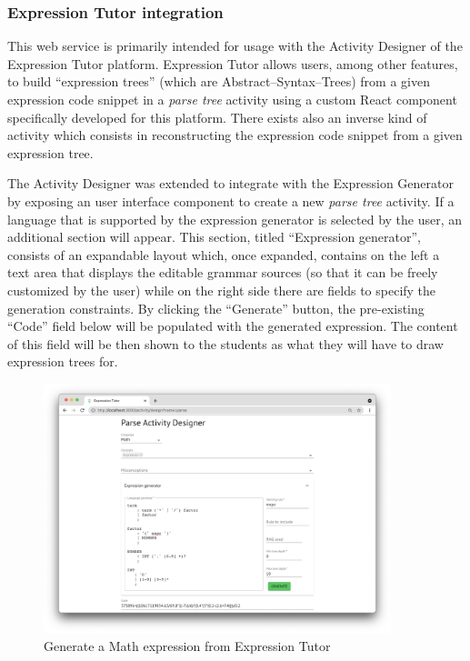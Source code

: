 \documentclass[]{usiinfbachelorproject}
\begin{document}
\subsubsection*{\textbf{Expression Tutor integration}}

This web service is primarily intended for usage with the Activity Designer
of the Expression Tutor platform. Expression Tutor allows users, among other
features, to build ``expression trees'' (which are Abstract–Syntax–Trees)
from a given expression code snippet in a \textit{parse tree} activity using
a custom React component specifically developed for this platform.
There exists also an inverse kind of activity which consists in reconstructing
the expression code snippet from a given expression tree.

The Activity Designer was extended to integrate with the Expression Generator 
by exposing an user interface component to create a new \textit{parse tree}
activity. If a language that is supported by the expression generator is
selected by the user, an additional section will appear.
This section, titled ``Expression generator'', consists of an expandable layout
which, once expanded, contains on the left a text area that displays the
editable grammar sources (so that it can be freely customized by the user)
while on the right side there are fields to specify the generation constraints.
By clicking the ``Generate'' button, the pre-existing ``Code'' field below will
be populated with the generated expression. The content of this field will be
then shown to the students as what they will have to draw expression trees for.

\begin{figure}[ht]
\centering
\includegraphics[width=0.9\textwidth]{img/ui_expr_tutor.png}
\caption{Generate a Math expression from Expression Tutor}
\end{figure}
\end{document}
